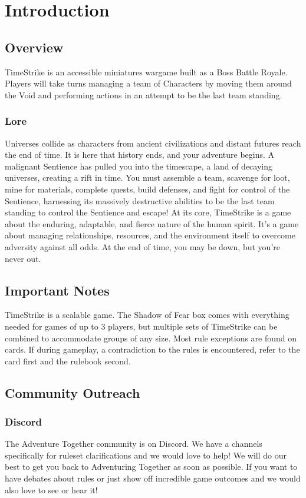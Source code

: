 \documentclass[../main.tex]{subfiles}
\begin{document}
\section{Introduction}

\subsection{Overview}
TimeStrike is an accessible miniatures wargame built as a Boss Battle Royale. Players will take turns managing a team of Characters by moving them around the Void and performing actions in an attempt to be the last team standing. 

\subsubsection{Lore}
Universes collide as characters from ancient civilizations and distant futures reach the end of time. It is here that history ends, and your adventure begins. A malignant Sentience has pulled you into the timescape, a land of decaying universes, creating a rift in time. You must assemble a team, scavenge for loot, mine for materials, complete quests, build defenses, and fight for control of the Sentience, harnessing its massively destructive abilities to be the last team standing to control the Sentience and escape! At its core, TimeStrike is a game about the enduring, adaptable, and fierce nature of the human spirit. It’s a game about managing relationships, resources, and the environment itself to overcome adversity against all odds. At the end of time, you may be down, but you’re never out.

\subsection{Important Notes}
TimeStrike is a scalable game. The Shadow of Fear box comes with everything needed for games of up to 3 players, but multiple sets of TimeStrike can be combined to accommodate groups of any size.
Most rule exceptions are found on cards. If during gameplay, a contradiction to the rules is encountered, refer to the card first and the rulebook second.

\subsection{Community Outreach}
\subsubsection{Discord}
The Adventure Together community is on Discord. We have a channels specifically for ruleset clarifications and we would love to help!  We will do our best to get you back to Adventuring Together as soon as possible. If you want to have debates about rules or just show off incredible game outcomes and we would also love to see or hear it!
\end{document}
